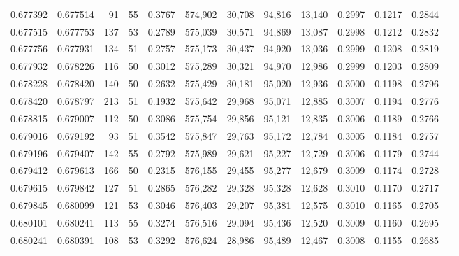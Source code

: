 \begin{tabular}{rrrrrrrrrrrrr}
0.677392 & 0.677514 &    91 &  55 &                                     0.3767 & 574,902 &  30,708 &  94,816 &  13,140 & 0.2997 & 0.1217 & 0.2844 \\
0.677515 & 0.677753 &   137 &  53 &                                     0.2789 & 575,039 &  30,571 &  94,869 &  13,087 & 0.2998 & 0.1212 & 0.2832 \\
0.677756 & 0.677931 &   134 &  51 &                                     0.2757 & 575,173 &  30,437 &  94,920 &  13,036 & 0.2999 & 0.1208 & 0.2819 \\
0.677932 & 0.678226 &   116 &  50 &                                     0.3012 & 575,289 &  30,321 &  94,970 &  12,986 & 0.2999 & 0.1203 & 0.2809 \\
0.678228 & 0.678420 &   140 &  50 &                                     0.2632 & 575,429 &  30,181 &  95,020 &  12,936 & 0.3000 & 0.1198 & 0.2796 \\
0.678420 & 0.678797 &   213 &  51 &                                     0.1932 & 575,642 &  29,968 &  95,071 &  12,885 & 0.3007 & 0.1194 & 0.2776 \\
0.678815 & 0.679007 &   112 &  50 &                                     0.3086 & 575,754 &  29,856 &  95,121 &  12,835 & 0.3006 & 0.1189 & 0.2766 \\
0.679016 & 0.679192 &    93 &  51 &                                     0.3542 & 575,847 &  29,763 &  95,172 &  12,784 & 0.3005 & 0.1184 & 0.2757 \\
0.679196 & 0.679407 &   142 &  55 &                                     0.2792 & 575,989 &  29,621 &  95,227 &  12,729 & 0.3006 & 0.1179 & 0.2744 \\
0.679412 & 0.679613 &   166 &  50 &                                     0.2315 & 576,155 &  29,455 &  95,277 &  12,679 & 0.3009 & 0.1174 & 0.2728 \\
0.679615 & 0.679842 &   127 &  51 &                                     0.2865 & 576,282 &  29,328 &  95,328 &  12,628 & 0.3010 & 0.1170 & 0.2717 \\
0.679845 & 0.680099 &   121 &  53 &                                     0.3046 & 576,403 &  29,207 &  95,381 &  12,575 & 0.3010 & 0.1165 & 0.2705 \\
0.680101 & 0.680241 &   113 &  55 &                                     0.3274 & 576,516 &  29,094 &  95,436 &  12,520 & 0.3009 & 0.1160 & 0.2695 \\
0.680241 & 0.680391 &   108 &  53 &                                     0.3292 & 576,624 &  28,986 &  95,489 &  12,467 & 0.3008 & 0.1155 & 0.2685 \\

\end{tabular}
